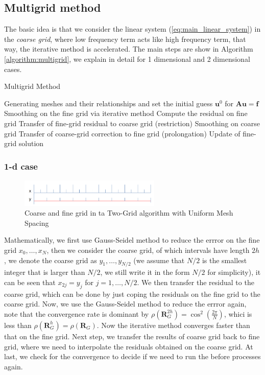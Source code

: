\documentclass[onecolumn, conference]{IEEEtran}
\begin{document}
\subsection{Multigrid method}
The basic idea is that we consider the linear system (\ref{eq:main_linear_system}) in the \emph{coarse grid}, where low frequency term acts like high frequency term, that way, the iterative method is accelerated.  The main steps are show in Algorithm \ref{algorithm:multigrid}, we explain in detail for 1 dimensional and 2 dimensional cases.

\begin{algorithm}
    \label{algorithm:multigrid}
    \caption{Multigrid Method}
    \begin{algorithmic}[1]
        \REQUIRE Generating meshes and their relationships and set the initial guess $\mathbf{u}^0$ for $\mathbf{A}\mathbf{u}=\mathbf{f}$
            \STATE Smoothing on the fine grid via iterative method
            \STATE Compute the residual on fine grid
            \STATE Transfer of fine-grid residual to coarse grid (restriction)
            \STATE Smoothing on coarse grid
            \STATE Transfer of coarse-grid correction to fine grid (prolongation)
            \STATE Update of fine-grid solution
        \ENDWHILE
    \end{algorithmic}
\end{algorithm}

\subsubsection{1-d case}
\begin{figure}[htbp]
    \centering
    \includegraphics[width=0.6\textwidth]{1d_multigrid.png}
    \caption{Coarse and fine grid in ta Two-Grid algorithm with Uniform Mesh Spacing}
    \label{fig:1d_multigrid}
\end{figure}

Mathematically, we first use Gauss-Seidel method to reduce the errror on the fine grid $x_0,\dots,x_N$, then we consider the coarse grid, of which intervals have length $2h$, we denote the coarse grid as $y_1,\dots,y_{N/2}$ (we assume that $N/2$ is the smallest integer that is larger than $N/2$, we still write it in the form $N/2$ for simplicity), it can be seen that $x_{2j}=y_{j}$ for $j=1,\dots,N/2$. We then transfer the residual to the coarse grid, which can be done by just coping the residuals on the fine grid to the coarse grid. Now, we use the Gauss-Seidel method to reduce the errror again, note that the convergence rate is dominant by $\rho(\mathbf{R}_G^{2h})=\cos^2\left(\frac{2\pi}{N}\right)$, whici is less than $\rho(\mathbf{R}_G^{h})=\rho(\mathbf{R}_G)$. Now the iterative method converges faster than that on the fine grid. Next step, we transfer the results of coarse grid back to fine grid, where we need to interpolate the residuals obtained on the coarse grid. At last, we check for the convergence to decide if we need to run the before processes again.
\end{document}
